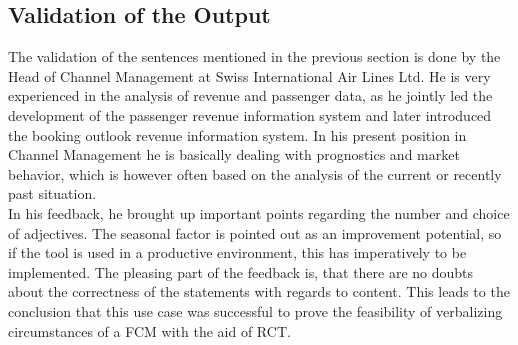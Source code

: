 \documentclass[conference]{IEEEtran}
\begin{document}
\subsection{Validation of the Output}
\label{subsec:validation}
The validation of the sentences mentioned in the previous section is done by the Head of Channel Management at Swiss International Air Lines Ltd. He is very experienced in the analysis of revenue and passenger data, as he jointly led the development of the passenger revenue information system and later introduced the booking outlook revenue information system. In his present position in Channel Management he is basically dealing with prognostics and market behavior, which is however often based on the analysis of the current or recently past situation.\\
In his feedback, he brought up important points regarding the number and choice of adjectives. The seasonal factor is pointed out as an improvement potential, so if the tool is used in a productive environment, this has imperatively to be implemented. The pleasing part of the feedback is, that there are no doubts about the correctness of the statements with regards to content. This leads to the conclusion that this use case was successful to prove the feasibility of verbalizing circumstances of a FCM with the aid of RCT.
\end{document}
